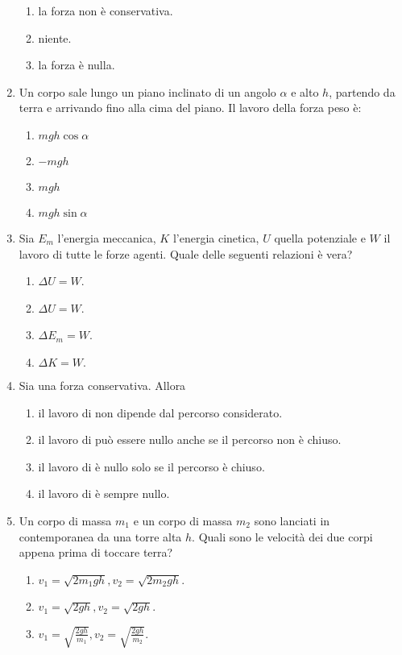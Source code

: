 \documentclass{article}
\begin{document}
\begin{enumerate}
\begin{enumerate}[label=\Alph*.]
    \item la forza non è conservativa.
    \item niente.
    \item la forza è nulla.
  \end{enumerate}
  \item Un corpo sale lungo un piano inclinato di un angolo $\alpha$ e alto $h$, partendo da terra e arrivando fino alla cima del piano. Il lavoro della forza peso è:
  \begin{enumerate}[label=\Alph*.]
    \item $mgh\cos\alpha$
    \item $-mgh$
    \item $mgh$
    \item $mgh\sin\alpha$
  \end{enumerate}
  \item Sia $E_m$ l'energia meccanica, $K$ l'energia cinetica, $U$ quella potenziale e $W$ il lavoro di tutte le forze agenti. Quale delle seguenti relazioni è vera?
  \begin{enumerate}[label=\Alph*.]
    \item $\Delta U=W$.
    \item $\Delta U=W$.
    \item $\Delta E_m=W$.
    \item $\Delta K=W.$
  \end{enumerate}
  \item Sia  una forza conservativa. Allora
  \begin{enumerate}[label=\Alph*.]
    \item il lavoro di  non dipende dal percorso considerato.
    \item il lavoro di  può essere nullo anche se il percorso non è chiuso.
    \item il lavoro di  è nullo solo se il percorso è chiuso.
    \item il lavoro di  è sempre nullo.
  \end{enumerate}
  \item Un corpo di massa $m_1$ e un corpo di massa $m_2$ sono lanciati in contemporanea da una torre alta $h$. Quali sono le velocità dei due corpi appena prima di toccare terra?
  \begin{enumerate}[label=\Alph*.]
    \item $v_1=\sqrt{2m_1gh}, v_2=\sqrt{2m_2gh}$.
    \item $v_1=\sqrt{2gh}, v_2=\sqrt{2gh}$.
    \item $v_1=\sqrt{\frac{2gh}{m_1}}, v_2=\sqrt{\frac{2gh}{m_2}}$.

\end{enumerate}
\end{enumerate}
\end{document}
